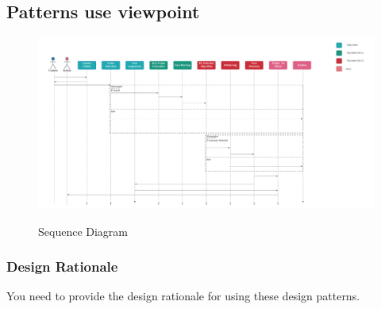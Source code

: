 \documentclass[12pt]{article}
\begin{document}
\subsection{Patterns use viewpoint}
\FloatBarrier
\begin{figure}[h]
  \centering
  \includegraphics[width=20cm]{sequenceDiagram.png}
  \label{fig:2}
   \caption{Sequence Diagram}
\end{figure}
\subsubsection{Design Rationale}
You need to provide the design rationale for using these design patterns.
\end{document}
